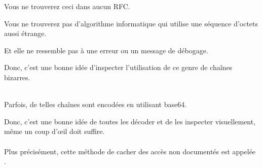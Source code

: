 Vous ne trouverez ceci dans aucun \ac{RFC}.

Vous ne trouverez pas d'algorithme informatique qui utilise une séquence d'octets
aussi étrange.

Et elle ne ressemble pas à une erreur ou un message de débogage.

Donc, c'est une bonne idée d'inspecter l'utilisation de ce genre de chaînes bizarres.\\
\\

Parfois, de telles chaînes sont encodées en utilisant base64.

Donc, c'est une bonne idée de toutes les décoder et de les inspecter visuellement,
même un coup d'\oe{}il doit suffire.\\
\\
Plus précisément, cette méthode de cacher des accès non documentés est appelée .

